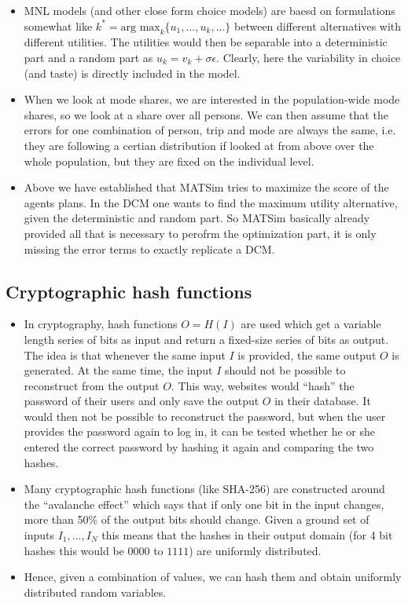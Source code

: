 \documentclass[a4paper]{article}
\begin{document}
\begin{itemize}
  \item MNL models (and other close form choice models) are baesd on formulations
  somewhat like $k^* = \text{arg max}_k \{ u_1, ..., u_k, ... \}$ between
  different alternatives with different utilities. The utilities would then be
  separable into a deterministic part and a random part as  $u_k = v_k + \sigma \epsilon$.
  Clearly, here the variability in choice (and taste) is directly included in
  the model.
  \item When we look at mode shares, we are interested in the population-wide
  mode shares, so we look at a share over all persons. We can then assume that
  the errors for one combination of person, trip and mode are always the
  same, i.e. they are following a certian distribution if looked at from above
  over the whole population, but they are fixed on the individual level.
  \item Above we have established that MATSim tries to maximize the score
  of the agents plans. In the DCM one wants to find the maximum utility
  alternative, given the deterministic and random part. So MATSim basically
  already provided all that is necessary to perofrm the optimization part, it
  is only missing the error terms to exactly replicate a DCM.
\end{itemize}

\subsection{Cryptographic hash functions}

\begin{itemize}
  \item In cryptography, hash functions $O = H(I)$ are used which get a variable length series
  of bits as input and return a fixed-size series of bits as output. The idea is
  that whenever the same input $I$ is provided, the same output $O$ is generated.
  At the same time, the input $I$ should not be possible to reconstruct from the
  output $O$. This way, websites would ``hash'' the password of their users and
  only save the output $O$ in their database. It would then not be possible to
  reconstruct the password, but when the user provides the password again
  to log in, it can be tested whether he or she entered the correct password
  by hashing it again and comparing the two hashes.
  \item Many cryptographic hash functions (like SHA-256) are constructed around
  the ``avalanche effect'' which says that if only one bit in the input changes,
  more than 50\% of the output bits should change. Given a ground set of inputs
  $I_1, ..., I_N$ this means that the hashes in their output domain (for
  4 bit hashes this would be $0000$ to $1111$) are uniformly distributed.
  \item Hence, given a combination of values, we can hash them and obtain
  uniformly distributed random variables.
\end{itemize}
\end{document}
